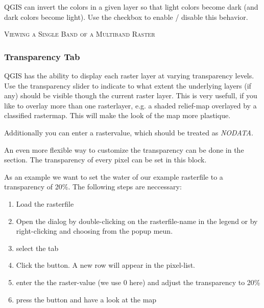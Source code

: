 \smallskip

QGIS can invert the colors in a given layer so that light colors become dark
(and dark colors become light). Use the  checkbox to
enable / disable this behavior.

\begin{Tip}\caption{\textsc{Viewing a Single Band of a Multiband Raster}}
\end{Tip} 

\subsubsection{Transparency Tab} \label{rastertab:transparency}

QGIS has the ability to display each raster layer at varying transparency
levels. Use the transparency slider to indicate to
what extent the underlying layers (if any) should be visible though the
current raster layer. 
This is very usefull, if
you like to overlay more than one rasterlayer, e.g. a shaded relief-map
overlayed by a classified rastermap. This will make the look of the map
more plastique.

Additionally you can enter a rastervalue, which should be treated as
{\em NODATA}.

An even more flexible way to customize the transparency can be done in the
 section.
The transparency of every pixel can be set in this block.

As an example we want to set the water of our example rasterfile
 to a transparency of 20\%. The following steps
are neccessary:
\begin{enumerate}
 \item  Load the rasterfile 
 \item Open the  dialog by double-clicking on the
 rasterfile-name in the legend or by right-clicking and choosing
  from the popup meun.
 \item select the  tab
 \item \label{enum:add} Click the 
 button. A new row will appear in the pixel-list.
 \item \label{enum:transp} enter the the raster-value (we use 0 here) and adjust the
 transparency to 20\%
 \item press the  button and have a look at the map
\end{enumerate}

